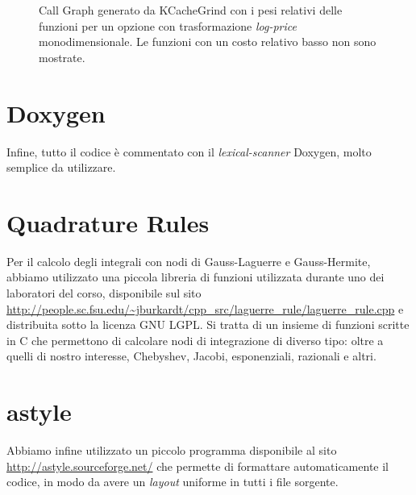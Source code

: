 \documentclass[a4paper,10pt]{report}
\theoremstyle{plain}
\theoremstyle{definition}
\theoremstyle{remark}
\begin{document}
\begin{figure}[!htb]
 \caption{Call Graph generato da \textsf{KCacheGrind} con i pesi relativi delle funzioni per un opzione con trasformazione \emph{log-price} monodimensionale. Le funzioni con un costo relativo basso non sono mostrate.}
\label{fig:callgraph}
 \end{figure}
\section{\textsf{Doxygen}}
Infine, tutto il codice \`e commentato con il \emph{lexical-scanner} \textsf{Doxygen}, molto semplice da utilizzare. 
\section{Quadrature Rules}
Per il calcolo degli integrali con nodi di Gauss-Laguerre e Gauss-Hermite, abbiamo utilizzato una piccola libreria di funzioni utilizzata durante uno dei laboratori del corso, disponibile sul sito \url{http://people.sc.fsu.edu/~jburkardt/cpp_src/laguerre_rule/laguerre_rule.cpp} e distribuita sotto la licenza GNU LGPL. Si tratta di un insieme di funzioni scritte in C che permettono di calcolare nodi di integrazione di diverso tipo: oltre a quelli di nostro interesse, Chebyshev, Jacobi, esponenziali, razionali e altri.
\section{\textsf{astyle}}
Abbiamo infine utilizzato un piccolo programma disponibile al sito \url{http://astyle.sourceforge.net/} che permette di formattare automaticamente il codice, in modo da avere un \emph{layout} uniforme in tutti i file sorgente.
\end{document}
